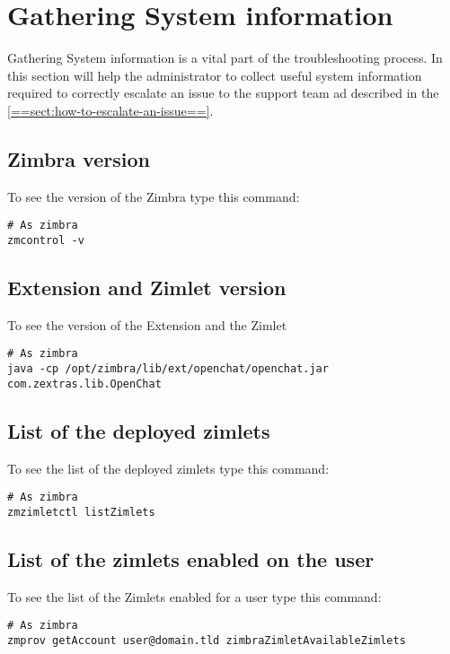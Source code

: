 \section{Gathering System information}
\label{==sect:gatheringinfo==}

Gathering System information is a vital part of the troubleshooting process. In this section will help the administrator
to collect useful system information required to correctly escalate an issue to the support team ad described in the
\ref{==sect:how-to-escalate-an-issue==}.

    \subsection{Zimbra version}
    \label{==sect:gatheringinfo-zversion==}
        To see the version of the Zimbra type this command:
        \begin{verbatim}
# As zimbra
zmcontrol -v
        \end{verbatim}

    \subsection{Extension and Zimlet version}
    \label{==sect:gatheringinfo-extension==}
        To see the version of the Extension and the Zimlet
        \begin{verbatim}
# As zimbra
java -cp /opt/zimbra/lib/ext/openchat/openchat.jar com.zextras.lib.OpenChat
        \end{verbatim}

    \subsection{List of the deployed zimlets}
    \label{==sect:gatheringinfo-listzimlets==}
        To see the list of the deployed zimlets type this command:
        \begin{verbatim}
# As zimbra
zmzimletctl listZimlets
        \end{verbatim}

    \subsection{List of the zimlets enabled on the user}
    \label{==sect:gatheringinfo-userzimlets==}
        To see the list of the Zimlets enabled for a user type this command:
        \begin{verbatim}
# As zimbra
zmprov getAccount user@domain.tld zimbraZimletAvailableZimlets
        \end{verbatim}

